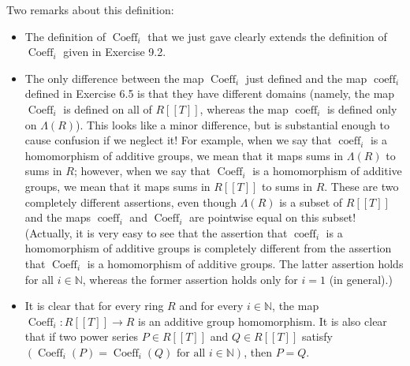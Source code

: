 \documentclass[numbers=enddot,12pt,final,onecolumn,notitlepage]{scrartcl}%
\begin{document}
Two remarks about this definition:

\begin{itemize}
\item The definition of $\operatorname*{Coeff}\nolimits_{i}$ that we just gave
clearly extends the definition of $\operatorname*{Coeff}\nolimits_{i}$ given
in Exercise 9.2.

\item The only difference between the map $\operatorname*{Coeff}\nolimits_{i}$
just defined and the map $\operatorname*{coeff}\nolimits_{i}$ defined in
Exercise 6.5 is that they have different domains (namely, the map
$\operatorname*{Coeff}\nolimits_{i}$ is defined on all of $R\left[  \left[
T\right]  \right]  $, whereas the map $\operatorname*{coeff}\nolimits_{i}$ is
defined only on $\Lambda\left(  R\right)  $). This looks like a minor
difference, but is substantial enough to cause confusion if we neglect it! For
example, when we say that $\operatorname*{coeff}\nolimits_{i}$ is a
homomorphism of additive groups, we mean that it maps sums in $\Lambda\left(
R\right)  $ to sums in $R$; however, when we say that $\operatorname*{Coeff}%
\nolimits_{i}$ is a homomorphism of additive groups, we mean that it maps sums
in $R\left[  \left[  T\right]  \right]  $ to sums in $R$. These are two
completely different assertions, even though $\Lambda\left(  R\right)  $ is a
subset of $R\left[  \left[  T\right]  \right]  $ and the maps
$\operatorname*{coeff}\nolimits_{i}$ and $\operatorname*{Coeff}\nolimits_{i}$
are pointwise equal on this subset! (Actually, it is very easy to see that the
assertion that $\operatorname*{coeff}\nolimits_{i}$ is a homomorphism of
additive groups is completely different from the assertion that
$\operatorname*{Coeff}\nolimits_{i}$ is a homomorphism of additive groups. The
latter assertion holds for all $i\in\mathbb{N}$, whereas the former assertion
holds only for $i=1$ (in general).)

\item It is clear that for every ring $R$ and for every $i\in\mathbb{N}$, the
map $\operatorname*{Coeff}\nolimits_{i}:R\left[  \left[  T\right]  \right]
\rightarrow R$ is an additive group homomorphism. It is also clear that if two
power series $P\in R\left[  \left[  T\right]  \right]  $ and $Q\in R\left[
\left[  T\right]  \right]  $ satisfy $\left(  \operatorname*{Coeff}%
\nolimits_{i}\left(  P\right)  =\operatorname*{Coeff}\nolimits_{i}\left(
Q\right)  \text{ for all }i\in\mathbb{N}\right)  $, then $P=Q$.
\end{itemize}
\end{document}
